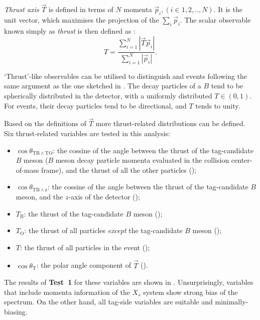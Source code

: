 \textit{Thrust axis} $\vec{T}$ is defined in terms of $N$ momenta $\vec{p}_i,(i\in{1,2,..,N})$.
It is the unit vector, which maximises the projection of the $\sum_i\vec{p}_i$.
The scalar observable known simply as \textit{thrust} is then defined as \cite{BaBar:2014omp}:
\begin{equation}\label{eq:thrust}
    T = \frac{\sum^N_{i=1}|\vec{T}\vec{p}_i|}{\sum^N_{i=1}|\vec{p}_i|}.
\end{equation}

`Thrust'-like observables can be utilised to distinguish \epem\ra\qqbar and \BtoXsgamma events following the same argument as the one sketched in .
The decay particles of a $B$ tend to be spherically distributed in the detector, with a uniformly distributed $T\in(0,1)$.
For \qqbar events, their decay particles tend to be directional, and $T$ tends to unity.

Based on the definitions of $\vec{T}$ more thrust-related distributions can be defined.
Six thrust-related variables are tested in this analysis:
\begin{itemize}
    \item $\cos\theta_{\mathrm{TB}\wedge\mathrm{TO}}$: the cossine of the angle between the thrust of the tag-candidate $B$ meson ($B$ meson decay particle momenta evaluated in the collision center-of-mass frame),
    and the thrust of all the other particles ();
    \item $\cos\theta_{\mathrm{TB}\wedge\mathrm{z}}$: the cossine of the angle between the thrust of the tag-candidate $B$ meson,
    and the $z$-axis of the detector ();
    \item $T_{\mathrm{B}}$: the thrust of the tag-candidate $B$ meson ();
    \item $T_{\mathrm{O}}$: the thrust of all particles \textit{except} the tag-candidate $B$ meson ();
    \item $T$: the thrust of all particles in the event ();
    \item $\cos\theta_{\mathrm{T}}$: the polar angle component of $\vec{T}$ ().
\end{itemize}

The results of \textbf{Test~1} for these variables are shown in .
Unsurprisingly, variables that include momenta information of the $X_s$ system show strong bias of the spectrum.
On the other hand, all tag-side variables are suitable and minimally-biasing.

